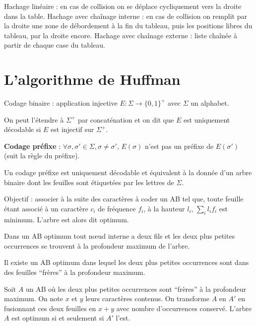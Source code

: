 \documentclass[a4paper,10pt,twocolumn]{article}
\begin{document}
	\begin{defn}
	Hachage linéaire : en cas de collision on se déplace cycliquement vers la droite dans la table.
	Hachage avec chaînage interne : en cas de collision on remplit par la droite une zone de débordement à la fin du tableau, puis les positions libres du tableau, par la droite encore.
	Hachage avec chaînage externe : liste chaînée à partir de chaque case du tableau.
	\end{defn}


\section{L'algorithme de Huffman}

	\begin{defn}
	Codage binaire : application injective $E \colon \Sigma \to \{ 0,1 \}^+$ avec $\Sigma$ un alphabet.
	\end{defn}

	On peut l'étendre à $\Sigma^+$ par concaténation et on dit que $E$ est uniquement décodable si $E$ est injectif sur $\Sigma^+$.

	\begin{defn}
	\textbf{Codage préfixe} : $\forall \sigma, \sigma' \in \Sigma, \sigma \neq \sigma'$, $E(\sigma)$ n'est pas un préfixe de $E(\sigma')$ (suit la règle du préfixe).
	\end{defn}

	\begin{pop}
	Un codage préfixe est uniquement décodable et équivalent à la donnée d'un arbre binaire dont les feuilles sont étiquetées par les lettres de $\Sigma$.
	\end{pop}

	Objectif : associer à la suite des caractères à coder un AB tel que, toute feuille étant associé à un caractère $c_i$ de fréquence $f_i$, à la hauteur $l_i$, $\sum_i l_i f_i$ est minimum.
	L'arbre est alors dit optimum.

	\begin{lem}
	Dans un AB optimum tout nœud interne a deux fils et les deux plus petites occurrences se trouvent à la profondeur maximum de l'arbre.
	\end{lem}

	\begin{lem}
	Il existe un AB optimum dans lequel les deux plus petites occurrences sont dans des feuilles “frères” à la profondeur maximum.
	\end{lem}

	\begin{lem}
	Soit $A$ un AB où les deux plus petites occurrences sont “frères” à la profondeur maximum.
	On note $x$ et $y$ leurs caractères contenus.
	On transforme $A$ en $A'$ en fusionnant ces deux feuilles en $x + y$ avec nombre d'occurrences conservé.
	L'arbre $A$ est optimum si et seulement si $A'$ l'est.
	\end{lem}
\end{document}
